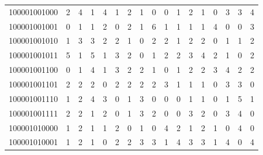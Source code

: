 \documentclass[10pt,a4paper]{article}
\begin{document}
\begin{longtable}{ |c|c|c|c|c|c|c|c|c|c|c|c|c|c|c|c|c| }
    100001001000              & 2                            & 4                                & 1                            & 4                              & 1   & 2   & 1   & 0   & 0   & 1   & 2   & 1   & 0   & 3   & 3   & 4   \\
    100001001001              & 0                            & 1                                & 1                            & 2                              & 0   & 2   & 1   & 6   & 1   & 1   & 1   & 1   & 4   & 0   & 0   & 3   \\
    100001001010              & 1                            & 3                                & 3                            & 2                              & 2   & 1   & 0   & 2   & 2   & 1   & 2   & 2   & 0   & 1   & 1   & 2   \\
    100001001011              & 5                            & 1                                & 5                            & 1                              & 3   & 2   & 0   & 1   & 2   & 2   & 3   & 4   & 2   & 1   & 0   & 2   \\
    100001001100              & 0                            & 1                                & 4                            & 1                              & 3   & 2   & 2   & 1   & 0   & 1   & 2   & 2   & 3   & 4   & 2   & 2   \\
    100001001101              & 2                            & 2                                & 2                            & 0                              & 2   & 2   & 2   & 2   & 3   & 1   & 1   & 1   & 0   & 3   & 3   & 0   \\
    100001001110              & 1                            & 2                                & 4                            & 3                              & 0   & 1   & 3   & 0   & 0   & 0   & 1   & 1   & 0   & 1   & 5   & 1   \\
    100001001111              & 2                            & 2                                & 1                            & 2                              & 0   & 1   & 3   & 2   & 0   & 0   & 3   & 2   & 0   & 3   & 4   & 0   \\
    100001010000              & 1                            & 2                                & 1                            & 1                              & 2   & 0   & 1   & 0   & 4   & 2   & 1   & 2   & 1   & 0   & 4   & 0   \\
    100001010001              & 1                            & 2                                & 1                            & 0                              & 2   & 2   & 3   & 3   & 1   & 4   & 3   & 3   & 1   & 4   & 0   & 4   \\

\end{longtable}
\end{document}
